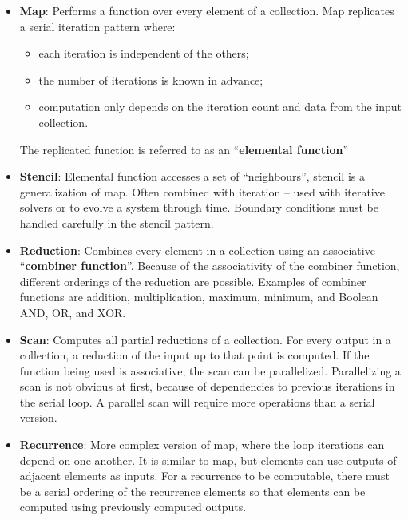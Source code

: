 \begin{itemize}
\begin{itemize}
        \item \textbf{Map}: Performs a function over every element of a collection. Map replicates a serial iteration pattern where:
        \begin{itemize}
            \item each iteration is independent of the others;
            \item the number of iterations is known in advance;
            \item computation only depends on the iteration count and data from the input collection.
        \end{itemize}
            \par The replicated function is referred to as an \enquote{\textbf{elemental function}}
%
\clearpage
%
        \item \textbf{Stencil}: Elemental function accesses a set of \enquote{neighbours}, stencil is a generalization of map. Often combined with iteration – used with iterative solvers or to evolve a system through time. Boundary conditions must be handled carefully in the stencil pattern.
        \item \textbf{Reduction}: Combines every element in a collection using an associative \enquote{\textbf{combiner function}}. Because of the associativity of the combiner function, different orderings of the reduction are possible. Examples of combiner functions are addition, multiplication, maximum, minimum, and Boolean AND, OR, and XOR.
        \item \textbf{Scan}: Computes all partial reductions of a collection. For every output in a collection, a reduction of the input up to that point is computed. If the function being used is associative, the scan can be parallelized. Parallelizing a scan is not obvious at first, because of dependencies to previous iterations in the serial loop. A parallel scan will require more operations than a serial version.
        \item \textbf{Recurrence}: More complex version of map, where the loop iterations can depend on one another. It is similar to map, but elements can use outputs of adjacent elements as inputs. For a recurrence to be computable, there must be a serial ordering of the recurrence elements so that elements can be computed using previously computed outputs.
    \end{itemize}

\end{itemize}
